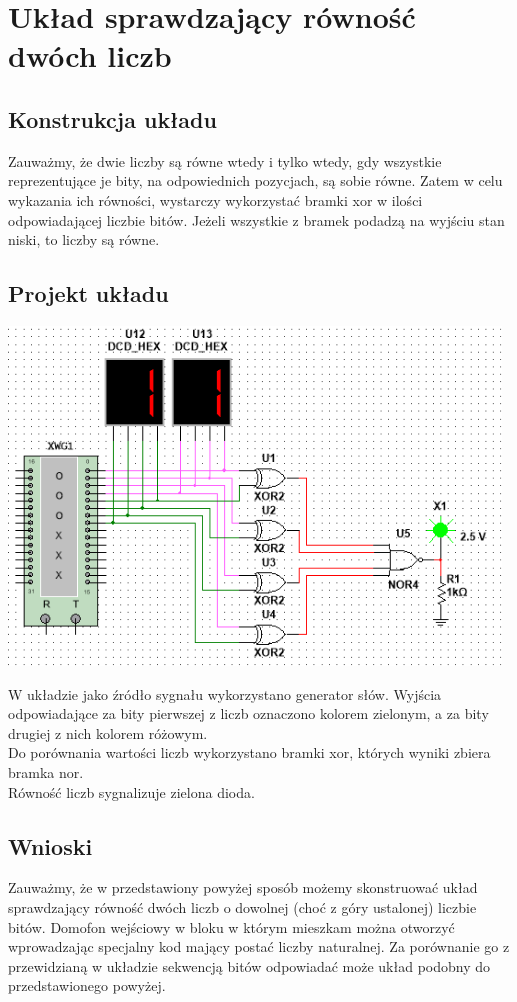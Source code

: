 \documentclass{article}
\begin{document}
            
    \section{Układ sprawdzający równość dwóch liczb}
        \subsection{Konstrukcja układu}
            Zauważmy, że dwie liczby są równe wtedy i tylko wtedy, gdy wszystkie reprezentujące je bity, na odpowiednich pozycjach, są sobie równe. Zatem w celu wykazania ich równości, wystarczy wykorzystać bramki xor w ilości odpowiadającej liczbie bitów. Jeżeli wszystkie z bramek podadzą na wyjściu stan niski, to liczby są równe.

        \subsection{Projekt układu}
            \begin{center}
                \includegraphics[height=9cm]{reports/img/Z1B_1.png}\\
            \end{center}
            W układzie jako źródło sygnału wykorzystano generator słów. Wyjścia odpowiadające za bity pierwszej z liczb oznaczono kolorem zielonym, a za bity drugiej z nich kolorem różowym. \\
            Do porównania wartości liczb wykorzystano bramki xor, których wyniki zbiera bramka nor. \\
            Równość liczb sygnalizuje zielona dioda. 
            \FloatBarrier
            
        \subsection{Wnioski}
            Zauważmy, że w przedstawiony powyżej sposób możemy skonstruować układ sprawdzający równość  dwóch liczb o dowolnej (choć z góry ustalonej) liczbie bitów. Domofon wejściowy w bloku w którym mieszkam można otworzyć wprowadzając specjalny kod mający postać liczby naturalnej. Za porównanie go z przewidzianą w układzie sekwencją bitów odpowiadać może układ podobny do przedstawionego powyżej. 
\end{document}

